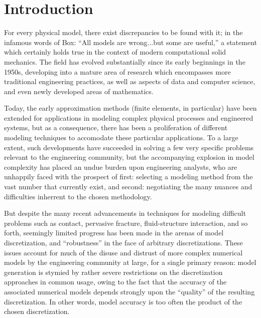 \chapter{Introduction}

For every physical model, there exist discrepancies to be found with it; in the infamous words of Box: ``All models are wrong...but some are useful,'' a statement which certainly holds true in the context of modern computational solid mechanics. The field has evolved substantially since its early beginnings in the 1950s, developing into a mature area of research which encompasses more traditional engineering practices, as well as aspects of data and computer science, and even newly developed areas of mathematics.

Today, the early approximation methods (finite elements, in particular) have been extended for applications in modeling complex physical processes and engineered systems, but as a consequence, there has been a proliferation of different modeling techniques to accomodate these particular applications. To a large extent, such developments have succeeded in solving a few very specific problems relevant to the engineering community, but the accompanying explosion in model complexity has placed an undue burden upon engineering analysts, who are unhappily faced with the prospect of first: selecting a modeling method from the vast number that currently exist, and second: negotiating the many nuances and difficulties inherrent to the chosen methodology.

But despite the many recent advancements in techniques for modeling difficult problems such as contact, pervasive fracture, fluid-structure interaction, and so forth, seemingly limited progress has been made in the arenas of model discretization, and ``robustness'' in the face of arbitrary discretizations. These issues account for much of the disuse and distrust of more complex numerical models by the engineering community at large, for a single primary reason: model generation is stymied by rather severe restrictions on the discretization approaches in common usage, owing to the fact that the accuracy of the associated numerical models depends strongly upon the ``quality'' of the resulting discretization. In other words, model accuracy is too often the product of the chosen discretization.

